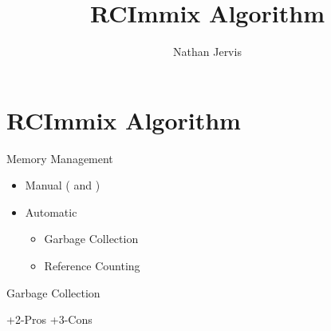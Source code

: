 \documentclass[style=paintings]{powerdot}
\title{RCImmix Algorithm}
\author{Nathan Jervis}
\begin{document}
	\maketitle

	\section{RCImmix Algorithm}

	\begin{slide}{Memory Management}
		\begin{itemize}
			\item Manual ( and )
			\item Automatic
			\begin{itemize}
				\item Garbage Collection
				\item Reference Counting
			\end{itemize}
		\end{itemize}
	\end{slide}
	
	\begin{slide}{Garbage Collection}
		\begin{itemize}
		
			\onslide+{2-}{Pros}
			\onslide+{3-}{Cons}
		\end{itemize}
	\end{slide}
\end{document}
